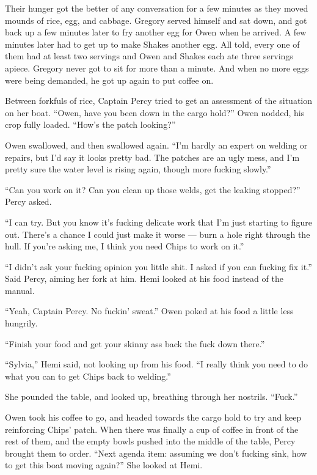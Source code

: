 \documentclass[
]{scrbook}
\begin{document}
Their hunger got the better of any conversation for a few minutes as
they moved mounds of rice, egg, and cabbage. Gregory served himself and
sat down, and got back up a few minutes later to fry another egg for
Owen when he arrived. A few minutes later had to get up to make Shakes
another egg. All told, every one of them had at least two servings and
Owen and Shakes each ate three servings apiece. Gregory never got to sit
for more than a minute. And when no more eggs were being demanded, he
got up again to put coffee on.

Between forkfuls of rice, Captain Percy tried to get an assessment of
the situation on her boat. ``Owen, have you been down in the cargo
hold?'' Owen nodded, his crop fully loaded. ``How's the patch looking?''

Owen swallowed, and then swallowed again. ``I'm hardly an expert on
welding or repairs, but I'd say it looks pretty bad. The patches are an
ugly mess, and I'm pretty sure the water level is rising again, though
more fucking slowly.''

``Can you work on it? Can you clean up those welds, get the leaking
stopped?'' Percy asked.

``I can try. But you know it's fucking delicate work that I'm just
starting to figure out. There's a chance I could just make it worse ---
burn a hole right through the hull. If you're asking me, I think you
need Chips to work on it.''

``I didn't ask your fucking opinion you little shit. I asked if you can
fucking fix it.'' Said Percy, aiming her fork at him. Hemi looked at his
food instead of the manual.

``Yeah, Captain Percy. No fuckin' sweat.'' Owen poked at his food a
little less hungrily.

``Finish your food and get your skinny ass back the fuck down there.''

``Sylvia,'' Hemi said, not looking up from his food. ``I really think
you need to do what you can to get Chips back to welding.''

She pounded the table, and looked up, breathing through her nostrils.
``Fuck.''

Owen took his coffee to go, and headed towards the cargo hold to try and
keep reinforcing Chips' patch. When there was finally a cup of coffee in
front of the rest of them, and the empty bowls pushed into the middle of
the table, Percy brought them to order. ``Next agenda item: assuming we
don't fucking sink, how to get this boat moving again?'' She looked at
Hemi.
\end{document}
